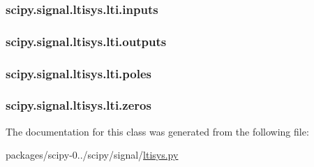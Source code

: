 \subsubsection[{inputs}]{\setlength{\rightskip}{0pt plus 5cm}scipy.\+signal.\+ltisys.\+lti.\+inputs}\label{classscipy_1_1signal_1_1ltisys_1_1lti_a62bd5131a43416901c4ce6ec549210e7}
\hypertarget{classscipy_1_1signal_1_1ltisys_1_1lti_ab6a912ffa9d79d13b2eec6dc0281f319}{}
\subsubsection[{outputs}]{\setlength{\rightskip}{0pt plus 5cm}scipy.\+signal.\+ltisys.\+lti.\+outputs}\label{classscipy_1_1signal_1_1ltisys_1_1lti_ab6a912ffa9d79d13b2eec6dc0281f319}
\hypertarget{classscipy_1_1signal_1_1ltisys_1_1lti_a1efdd521fe48a6c8d1851695841f6207}{}
\subsubsection[{poles}]{\setlength{\rightskip}{0pt plus 5cm}scipy.\+signal.\+ltisys.\+lti.\+poles}\label{classscipy_1_1signal_1_1ltisys_1_1lti_a1efdd521fe48a6c8d1851695841f6207}
\hypertarget{classscipy_1_1signal_1_1ltisys_1_1lti_a3d62ea1e21f611b30d68bca12f7dc7c5}{}
\subsubsection[{zeros}]{\setlength{\rightskip}{0pt plus 5cm}scipy.\+signal.\+ltisys.\+lti.\+zeros}\label{classscipy_1_1signal_1_1ltisys_1_1lti_a3d62ea1e21f611b30d68bca12f7dc7c5}


The documentation for this class was generated from the following file\+:\begin{DoxyCompactItemize}
\item 
packages/scipy-\/0../scipy/signal/\hyperlink{ltisys_8py}{ltisys.\+py}\end{DoxyCompactItemize}
